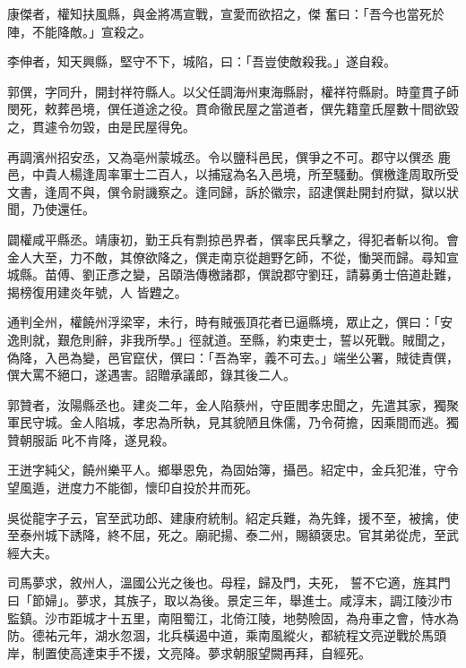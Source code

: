 \begin{pinyinscope}
 康傑者，權知扶風縣，與金將馮宣戰，宣愛而欲招之，傑
 奮曰：「吾今也當死於陣，不能降敵。」宣殺之。



 李伸者，知天興縣，堅守不下，城陷，曰：「吾豈使敵殺我。」遂自殺。



 郭僎，字同升，開封祥符縣人。以父任調海州東海縣尉，權祥符縣尉。時童貫子師閔死，敕葬邑境，僎任道途之役。貫命徹民屋之當道者，僎先籍童氏屋數十間欲毀之，貫遽令勿毀，由是民屋得免。



 再調濱州招安丞，又為亳州蒙城丞。令以鹽科邑民，僎爭之不可。郡守以僎丞
 鹿邑，中貴人楊逢周率軍士二百人，以捕寇為名入邑境，所至騷動。僎檄逢周取所受文書，逢周不與，僎令尉譏察之。逢同歸，訴於徽宗，詔逮僎赴開封府獄，獄以狀聞，乃使還任。



 闢權咸平縣丞。靖康初，勤王兵有剽掠邑界者，僎率民兵擊之，得犯者斬以徇。會金人大至，力不敵，其僚欲降之，僎走南京從趙野乞師，不從，慟哭而歸。尋知宣城縣。苗傅、劉正彥之變，呂頤浩傳檄諸郡，僎說郡守劉玨，請募勇士倍道赴難，揭榜復用建炎年號，人
 皆韙之。



 通判全州，權饒州浮梁宰，未行，時有賊張頂花者已逼縣境，眾止之，僎曰：「安逸則就，艱危則辭，非我所學。」徑就道。至縣，約束吏士，誓以死戰。賊聞之，偽降，入邑為變，邑官竄伏，僎曰：「吾為宰，義不可去。」端坐公署，賊徒責僎，僎大罵不絕口，遂遇害。詔贈承議郎，錄其後二人。



 郭贊者，汝陽縣丞也。建炎二年，金人陷蔡州，守臣閻孝忠聞之，先遣其家，獨聚軍民守城。金人陷城，孝忠為所執，見其貌陋且侏儒，乃令荷擔，因乘間而逃。獨贊朝服詬
 叱不肯降，遂見殺。



 王迸字純父，饒州樂平人。鄉舉恩免，為固始簿，攝邑。紹定中，金兵犯淮，守令望風遁，迸度力不能御，懷印自投於井而死。



 吳從龍字子云，官至武功郎、建康府統制。紹定兵難，為先鋒，援不至，被擒，使至泰州城下誘降，終不屈，死之。廟祀揚、泰二州，賜額褒忠。官其弟從虎，至武經大夫。



 司馬夢求，敘州人，溫國公光之後也。母程，歸及門，夫死，
 誓不它適，旌其門曰「節婦」。夢求，其族子，取以為後。景定三年，舉進士。咸淳末，調江陵沙市監鎮。沙市距城才十五里，南阻蜀江，北倚江陵，地勢險固，為舟車之會，恃水為防。德祐元年，湖水忽涸，北兵橫遏中道，乘南風縱火，都統程文亮逆戰於馬頭岸，制置使高達束手不援，文亮降。夢求朝服望闕再拜，自經死。




\end{pinyinscope}
